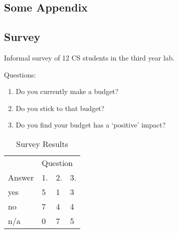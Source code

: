 \begin{appendices}
\chapter{Some Appendix}

\section{Survey} \label{app:budgetsurvey}
Informal survey of 12 CS students in the third year lab. 

Questions:
\begin{enumerate}
\item Do you currently make a budget?
\item Do you stick to that budget?
\item Do you find your budget has a `positive' impact?
\end{enumerate}

\begin{table}[h]
\centering
\caption{Survey Results}
\begin{tabular}{@{}llll@{}}
\toprule
       & \multicolumn{3}{l}{Question} \\ 
Answer & 1.       & 2.      & 3.      \\ \midrule
yes    & 5        & 1       & 3       \\
no     & 7        & 4       & 4       \\
n/a    & 0        & 7       & 5       \\ \bottomrule
\end{tabular}
\end{table}

\begin{comment}
Appendix A, B, C, etc.
These appendices can be very useful for giving detail that would otherwise disrupt the flow and readability of the report. They are given titles (e.g. "Appendix A: Example of the operation of the system") and bound in with the report. In general they are optional though, by convention, for a programming project, Appendix A often contains a non-trivial illustrative example of an input to the system and the corresponding output. For some projects, appendices may include tables of data. However, very long tables of data (more than about 10 pages) should be relegated to the Auxiliary Material, and not submitted as part of the Final Report. Program listings (apart from short code snippets) should likewise not be submitted as part of the Final Report.
\end{comment}

\end{appendices}